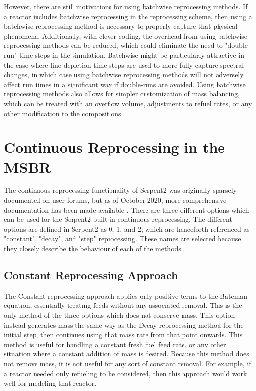 However, there are still motivations for using batchwise reprocessing methods. If a reactor includes batchwise reprocessing in the reprocessing scheme, then using a batchwise reprocessing method is necessary to properly capture that physical phenomena. Additionally, with clever coding, the overhead from using batchwise reprocessing methods can be reduced, which could eliminate the need to "double-run" time steps in the simulation. Batchwise might be particularly attractive in the case where fine depletion time steps are used to more fully capture spectral changes, in which case using batchwise reprocessing methods will not adversely affect run times in a significant way if double-runs are avoided. Using batchwise reprocessing methods also allows for simpler customization of mass balancing, which can be treated with an overflow volume, adjustments to refuel rates, or any other modification to the compositions.

\section{Continuous Reprocessing in the MSBR}

The continuous reprocessing functionality of Serpent2 was originally sparsely documented on user forums, but as of October 2020, more comprehensive documentation has been made available \cite{seifert_material_2020}.
There are three different options which can be used for the Serpent2 built-in continuous reprocessing. The different options are defined in Serpent2 as 0, 1, and 2; which are henceforth referenced as "constant", "decay", and "step" reprocessing. These names are selected because they closely describe the behaviour of each of the methods.

\subsection{Constant Reprocessing Approach}
The Constant reprocessing approach applies only positive terms to the Bateman equation, essentially treating feeds without any associated removal.
This is the only method of the three options which does not conserve mass. This option instead generates mass the same way as the Decay reprocessing method for the initial step, then continues using that mass rate from that point onwards.
This method is useful for handling a constant fresh fuel feed rate, or any other situation where a constant addition of mass is desired. Because this method does not remove mass, it is not useful for any sort of constant removal.
For example, if a reactor needed only refueling to be considered, then this approach would work well for modeling that reactor.

